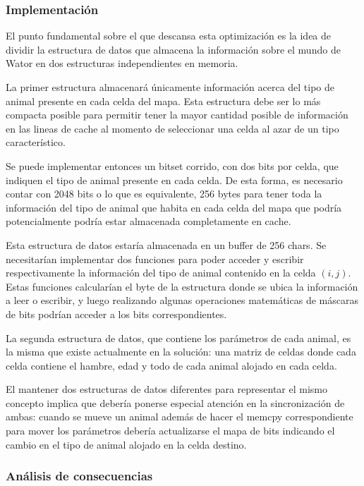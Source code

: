 \documentclass[a4paper,11pt]{article}
\begin{document}
\subsubsection{Implementación}

El punto fundamental sobre el que descansa esta optimización es la idea de
dividir la estructura de datos que almacena la información sobre el mundo de
Wator en dos estructuras independientes en memoria.

La primer estructura almacenará únicamente información acerca del tipo de
animal presente en cada celda del mapa. Esta estructura debe ser lo más
compacta posible para permitir tener la mayor cantidad posible de información
en las lineas de cache al momento de seleccionar una celda al azar de un tipo
característico.

Se puede implementar entonces un bitset corrido, con dos bits por celda, que
indiquen el tipo de animal presente en cada celda. De esta forma, es necesario
contar con 2048 bits o lo que es equivalente, 256 bytes para tener toda la
información del tipo de animal que habita en cada celda del mapa que podría
potencialmente podría estar almacenada completamente en cache.

Esta estructura de datos estaría almacenada en un buffer de 256 chars. Se
necesitarían implementar dos funciones para poder acceder y escribir
respectivamente la información del tipo de animal contenido en la celda \((i,
j)\). Estas funciones calcularían el byte de la estructura donde se ubica la
información a leer o escribir, y luego realizando algunas operaciones
matemáticas de máscaras de bits podrían acceder a los bits correspondientes.

La segunda estructura de datos, que contiene los parámetros de cada animal, es
la misma que existe actualmente en la solución: una matriz de celdas donde cada
celda contiene el hambre, edad y todo de cada animal alojado en cada celda.

El mantener dos estructuras de datos diferentes para representar el mismo
concepto implica que debería ponerse especial atención en la sincronización de
ambas: cuando se mueve un animal además de hacer el memcpy correspondiente para
mover los parámetros debería actualizarse el mapa de bits indicando el cambio
en el tipo de animal alojado en la celda destino.

\subsubsection{Análisis de consecuencias}
\end{document}
